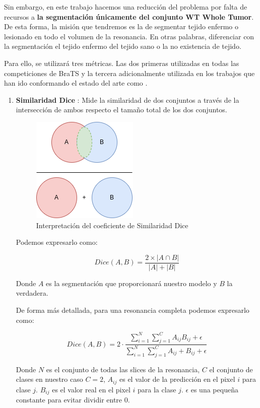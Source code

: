 Sin embargo, en este trabajo hacemos una reducción del problema por falta de recursos a \textbf{la segmentación únicamente del conjunto WT Whole Tumor}. De esta forma, la misión que tendremos es la de segmentar tejido enfermo o lesionado en todo el volumen de la resonancia. En otras palabras, diferenciar con la segmentación el tejido enfermo del tejido sano o la no existencia de tejido.

Para ello, se utilizará tres métricas. Las dos primeras utilizadas en todas las competiciones de BraTS y la tercera adicionalmente utilizada en los trabajos que han ido conformando el estado del arte como \cite{zhou2021latent}.

\begin{enumerate}
	\item \textbf{Similaridad Dice} : Mide la similaridad de dos conjuntos a través de la intersección de ambos respecto el tamaño total de los dos conjuntos.
	 
	\begin{figure}[!h]
		\centering
		\includegraphics[width=0.25\linewidth]{imagenes/dicesimilarity.drawio.png}
		\caption{Interpretación del coeficiente de Similaridad Dice}
	\end{figure}
	
	Podemos expresarlo como:
	
	$$ Dice(A, B) = \frac{2 \times |A \cap B|}{|A| + |B|}$$
	
	Donde $A$ es la segmentación que proporcionará nuestro modelo y $B$ la verdadera.
	
	De forma más detallada, para una resonancia completa podemos expresarlo como:
	
	$$ Dice(A, B) =  2 \cdot \frac{\sum_{i=1}^{N} \sum_{j=1}^{C} A_{ij} B_{ij} + \epsilon}{\sum_{i=1}^{N} \sum_{j=1}^{C} A_{ij} + B_{ij} + \epsilon} $$ 
	
	Donde $N$ es el conjunto de todas las slices de la resonancia, $C$ el conjunto de clases en nuestro caso $C = 2$, $A_{ij}$ es el valor de la predicción en el pixel $i$ para clase $j$. $B_{ij}$ es el valor real en el pixel $i$ para la clase $j$. $\epsilon$ es una pequeña constante para evitar dividir entre 0. 
	

\end{enumerate}
